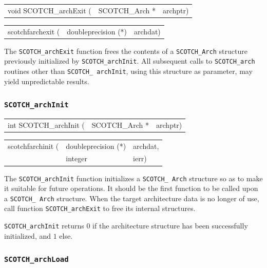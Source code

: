 \begin{itemize}
\progsyn

{\tt\begin{tabular}{l@{}ll}
void SCOTCH\_archExit ( & SCOTCH\_Arch * & archptr)
\end{tabular}}

{\tt\begin{tabular}{l@{}ll}
scotchfarchexit ( & doubleprecision (*) & archdat)
\end{tabular}}

\progdes

The {\tt SCOTCH\_archExit} function frees the contents of a
{\tt SCOTCH\_\lbt Arch} structure previously initialized by
{\tt SCOTCH\_\lbt archInit}. All subsequent calls to
{\tt SCOTCH\_\lbt arch} routines other than {\tt SCOTCH\_\lbt
archInit}, using this structure as parameter, may yield
unpredictable results.
\end{itemize}

\subsubsection{{\tt SCOTCH\_archInit}}

\begin{itemize}
\progsyn

{\tt\begin{tabular}{l@{}ll}
int SCOTCH\_archInit ( & SCOTCH\_Arch * & archptr)
\end{tabular}}

{\tt\begin{tabular}{l@{}ll}
scotchfarchinit ( & doubleprecision (*) & archdat, \\
                  & integer             & ierr)
\end{tabular}}

\progdes

The {\tt SCOTCH\_archInit} function initializes a {\tt SCOTCH\_\lbt
Arch} structure so as to make it suitable for future operations. It
should be the first function to be called upon a {\tt SCOTCH\_\lbt
Arch} structure.  When the target architecture data is no longer of
use, call function {\tt SCOTCH\_\lbt archExit} to free its internal
structures.

\progret

{\tt SCOTCH\_archInit} returns $0$ if the architecture structure has
been successfully initialized, and $1$ else.
\end{itemize}

\subsubsection{{\tt SCOTCH\_archLoad}}

